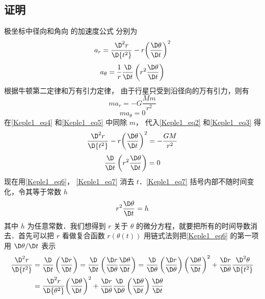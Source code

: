 \subsection{证明}
极坐标中径向和角向%
的加速度公式%
分别为
\begin{equation}\label{Keple1_eq2}
{a_r} = \frac{{{\D^2}r}}{{\D{t^2}}} - r{\left( {\frac{{\D\theta }}{{\D t}}} \right)^2}
\end{equation}
\begin{equation}\label{Keple1_eq3}
{a_\theta } = \frac{1}{r}\frac{\D}{{\D t}}\left( {{r^2}\frac{{\D\theta }}{{\D t}}} \right)
\end{equation}
根据牛顿第二定律和万有引力定律，%
由于行星只受到沿径向的万有引力，则有
\begin{equation}\label{Keple1_eq4}
m{a_r} =  - G\frac{{Mm}}{{{r^2}}}
\end{equation}
\begin{equation}\label{Keple1_eq5}
m{a_\theta } = 0
\end{equation}
在\autoref{Keple1_eq4} 和\autoref{Keple1_eq5} 中同除 $m$，  代入\autoref{Keple1_eq2} 和\autoref{Keple1_eq3} 得
\begin{equation}\label{Keple1_eq6}
\frac{{{\D^2}r}}{{\D{t^2}}} - r{\left( {\frac{{\D\theta }}{{\D t}}} \right)^2} =  - \frac{{GM}}{{{r^2}}}
\end{equation}
\begin{equation}\label{Keple1_eq7}
\frac{\D}{{\D t}}\left( {{r^2}\frac{{\D\theta }}{{\D t}}} \right) = 0
\end{equation}
现在用\autoref{Keple1_eq6}， \autoref{Keple1_eq7} 消去 $t$．\autoref{Keple1_eq7} 括号内部不随时间变化，令其等于常数 $h$
\begin{equation}\label{Keple1_eq8}
{r^2}\frac{{\D\theta }}{{\D t}} = h
\end{equation}
其中 $h$ 为任意常数．我们想得到 $r$ 关于 $\theta$ 的微分方程，就要把所有的时间导数消去．首先可以把 $r$ 看做复合函数 $r(\theta(t))$ 用链式法则把\autoref{Keple1_eq6} 的第一项用 $\D\theta/\D t$ 表示
\begin{equation}\label{Keple1_eq10}
\begin{aligned}
\frac{{{\D^2}r}}{{\D{t^2}}} & = \frac{\D}{{\D t}}\left(\frac{{\D r}}{{\D t}}\right) = \frac{\D}{{\D t}}\left( {\frac{{\D r}}{{\D\theta }}\frac{{\D\theta }}{{\D t}}} \right) = \frac{\D}{{\D\theta }}\left( {\frac{{\D r}}{{\D\theta }}} \right){\left( {\frac{{\D\theta }}{{\D t}}} \right)^2} + \frac{{\D r}}{{\D\theta }}\frac{{{\D^2}\theta }}{{\D{t^2}}}\\
& = \frac{{{\D^2}r}}{{\D{\theta ^2}}}{\left( {\frac{{\D\theta }}{{\D t}}} \right)^2} + \frac{{\D r}}{{\D\theta }}\frac{\D}{{\D\theta }}\left( {\frac{{\D\theta }}{{\D t}}} \right)\frac{{\D\theta }}{{\D t}}
\end{aligned}
\end{equation}
